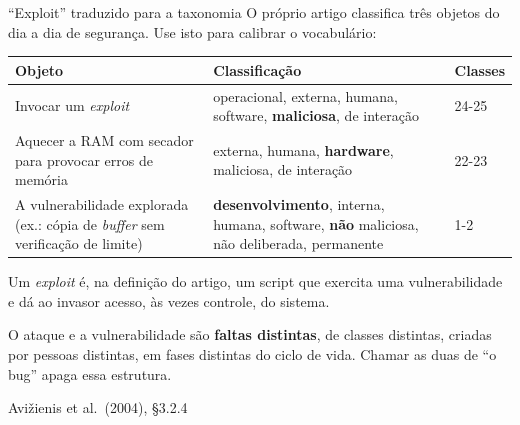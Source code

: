\documentclass{beamer}
\newcommand{\sect}[1]{\par\smallskip\hfill{\tiny\color{black!55}Avi\v{z}ienis et al.\ (2004), #1}}
\begin{document}
\begin{frame}{``Exploit'' traduzido para a taxonomia}
    \footnotesize
    O pr\'oprio artigo classifica tr\^es objetos do dia a dia de seguran\c{c}a. Use isto para calibrar o vocabul\'ario:
    \smallskip
    \scriptsize
    \begin{tabularx}{\linewidth}{@{}p{3.4cm} >{\raggedright\arraybackslash}X p{1.3cm}@{}}
        \toprule
        \textbf{Objeto} & \textbf{Classifica\c{c}\~ao} & \textbf{Classes} \\
        \midrule
        \rowcolor{depVermelho!7} Invocar um \textit{exploit} & operacional, externa, humana, software, \textbf{maliciosa}, de intera\c{c}\~ao & 24-25 \\
        \rowcolor{depVermelho!7} Aquecer a RAM com secador para provocar erros de mem\'oria & externa, humana, \textbf{hardware}, maliciosa, de intera\c{c}\~ao & 22-23 \\
        \rowcolor{depAzul!7} A vulnerabilidade explorada (ex.: c\'opia de \textit{buffer} sem verifica\c{c}\~ao de limite) & \textbf{desenvolvimento}, interna, humana, software, \textbf{n\~ao} maliciosa, n\~ao deliberada, permanente & 1-2 \\
        \bottomrule
    \end{tabularx}
    \smallskip
    {\scriptsize Um \textit{exploit} \'e, na defini\c{c}\~ao do artigo, um script que exercita uma vulnerabilidade e d\'a ao invasor acesso, \`as vezes controle, do sistema.}
    \smallskip
    \begin{ancora}
        \scriptsize
        O ataque e a vulnerabilidade s\~ao \textbf{faltas distintas}, de classes distintas, criadas por pessoas distintas, em fases distintas do ciclo de vida. Chamar as duas de ``o bug'' apaga essa estrutura.
    \end{ancora}
    \sect{\S3.2.4}
\end{frame}
\end{document}
